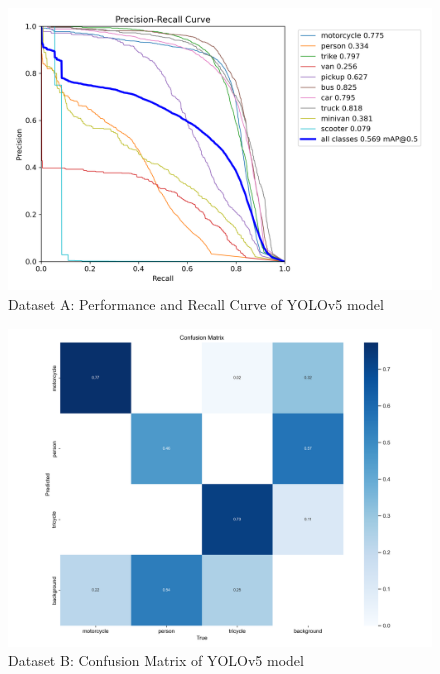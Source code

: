 \documentclass[conference]{IEEEtran}
\begin{document}
		\begin{figure}[h]
			\centering
			\includegraphics[width=\columnwidth]{Figures/dataset_a/PR_curve.png}
			\caption{Dataset A: Performance and Recall Curve of YOLOv5 model}
			\label{fig:ukDatasetYolov5LargeWeightPRCurve}
		\end{figure}

		\begin{figure}[h]
			\centering
			\includegraphics[width=\columnwidth]{Figures/dataset_b/b_confusion_matrix.png}
			\caption{Dataset B: Confusion Matrix of YOLOv5 model}
			\label{fig:mtpDatasetYolov5LargeWeight}
		\end{figure}
\end{document}
